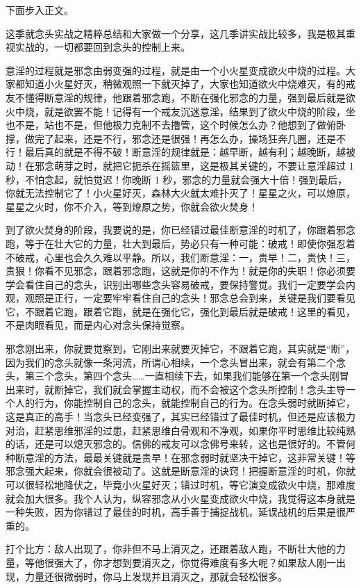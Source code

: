 \documentclass{ctexart}
\begin{document}
下面步入正文。

这季就念头实战之精粹总结和大家做一个分享，这几季讲实战比较多，我是极其重视实战的，一切都要回到念头的控制上来。

意淫的过程就是邪念由弱变强的过程，就是由一个小火星变成欲火中烧的过程。大家都知道小火星好灭，稍微观照一下就灭掉了，大家也知道欲火中烧难灭，有的戒友不懂得断意淫的规律，他跟着邪念跑，不断在强化邪念的力量，强到最后就是欲火中烧，就是欲罢不能！记得有一个戒友沉迷意淫，结果到了欲火中烧的阶段，坐也不是，站也不是，但他极力克制不去撸管，这个时候怎么办？他想到了做俯卧撑，做完了起来，还是不行，邪念还是很强！再怎么办，操场狂奔几圈，还是不行！最后真的就是不得不破！断意淫的规律就是：越早断，越有利；越晚断，越被动！在邪念萌芽之时，就把它扼杀在摇篮里，这是极其关键的，不要让意淫超过 1 秒，不怕念起，就怕觉迟！你晚断 1 秒，邪念的力量就会强大十倍！强到最后，你就无法控制它了！小火星好灭，森林大火就太难扑灭了！星星之火，可以燎原，星星之火时，你不介入，等到燎原之势，你就会欲火焚身！

到了欲火焚身的阶段，我要说的是，你已经错过最佳断意淫的时机了，你跟着邪念跑，等于在壮大它的力量，壮大到最后，势必只有一种可能：破戒！即使你强忍着不破戒，心里也会久久难以平静。所以，我们断意淫：一，贵早！二，贵快！三，贵狠！你看不见邪念，跟着邪念跑，这就是你的不作为！就是你的失职！你必须要学会看住自己的念头，识别出哪些念头容易破戒，要保持警觉。我们一定要学会内观，观照是正行，一定要牢牢看住自己的念头！邪念总会到来，关键是我们要看见它，不跟着它跑，跟着它跑，就是在强化它，强化到最后就是破戒！这里的看见，不是肉眼看见，而是内心对念头保持觉察。

邪念刚出来，你就要觉察到，它刚出来就要灭掉它，不跟着它跑，其实就是“断”，因为我们的念头就像一条河流，所谓心相续，一个念头冒出来，就会有第二个念头，第三个念头，第四个念头……一直相续下去，如果我们能够在第一个念头刚冒出来时，就断掉它，我们就会掌握主动权，而不会被这个念头所控制！念头主导一个人的行为，你能控制自己的念头，就能控制自己的行为。在念头弱时就断掉它，这是真正的高手！当念头已经变强了，其实已经错过了最佳时机，但还是应该极力对治，赶紧思维邪淫的过患，赶紧思维白骨观和不净观，如果你平时思维比较纯熟的话，还是可以熄灭邪念的。信佛的戒友可以念佛号来转，这也是很好的。不管何种断意淫的方法，最最关键就是贵早！在邪念弱时就坚决干掉它，这非常关键！等邪念强大起来，你就会很被动了。这就是断意淫的诀窍！把握断意淫的时机，你就可以很轻松地降伏之，毕竟小火星好灭；错过时机，等它演变成欲火中烧，那难度就会加大很多。我个人认为，纵容邪念从小火星变成欲火中烧，我觉得这本身就是一种失败，因为你错过了最佳的时机，高手善于捕捉战机，延误战机的后果是很严重的。

打个比方：敌人出现了，你非但不马上消灭之，还跟着敌人跑，不断壮大他的力量，等他很强大了，你才想到要消灭之，你觉得难度有多大呢？如果敌人刚一出现，力量还很微弱时，你马上发现并且消灭之，那就会轻松很多。
\end{document}
